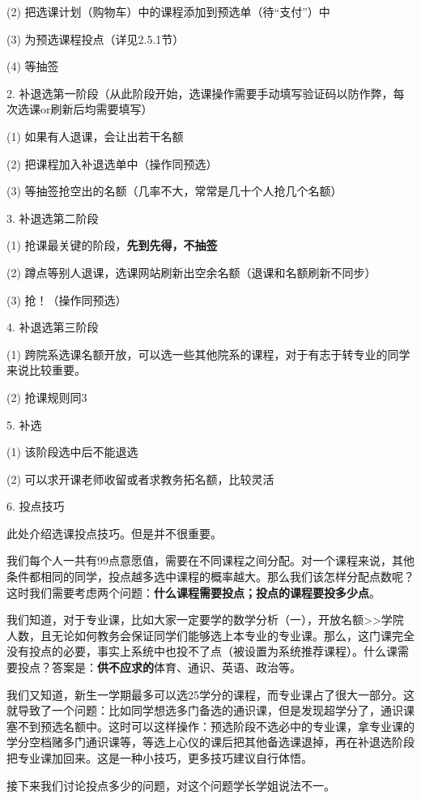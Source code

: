 \documentclass[11pt,oneside]{book}
\begin{document}
(2) 把选课计划（购物车）中的课程添加到预选单（待“支付”）中

(3) 为预选课程投点（详见2.5.1节）

(4) 等抽签

2. 补退选第一阶段（从此阶段开始，选课操作需要手动填写验证码以防作弊，每次选课or刷新后均需要填写）

(1) 如果有人退课，会让出若干名额

(2) 把课程加入补退选单中（操作同预选）

(3) 等抽签抢空出的名额（几率不大，常常是几十个人抢几个名额）

3. 补退选第二阶段

(1) 抢课最关键的阶段，\textbf{\textbf{先到先得，不抽签}}

(2) 蹲点等别人退课，选课网站刷新出空余名额（退课和名额刷新不同步）

(3) 抢！（操作同预选）

4. 补退选第三阶段

(1) 跨院系选课名额开放，可以选一些其他院系的课程，对于有志于转专业的同学来说比较重要。

(2) 抢课规则同3

5. 补选

(1) 该阶段选中后不能退选

(2) 可以求开课老师收留或者求教务拓名额，比较灵活

6. 投点技巧

此处介绍选课投点技巧。但是并不很重要。

我们每个人一共有99点意愿值，需要在不同课程之间分配。对一个课程来说，其他条件都相同的同学，投点越多选中课程的概率越大。那么我们该怎样分配点数呢？这时我们需要考虑两个问题：\textbf{\textbf{什么课程需要投点；投点的课程要投多少点}}。

我们知道，对于专业课，比如大家一定要学的数学分析（一），开放名额>>学院人数，且无论如何教务会保证同学们能够选上本专业的专业课。那么，这门课完全没有投点的必要，事实上系统中也投不了点（被设置为系统推荐课程）。什么课需要投点？答案是：\textbf{\textbf{供不应求的}}体育、通识、英语、政治等。

我们又知道，新生一学期最多可以选25学分的课程，而专业课占了很大一部分。这就导致了一个问题：比如同学想选多门备选的通识课，但是发现超学分了，通识课塞不到预选名额中。这时可以这样操作：预选阶段不选必中的专业课，拿专业课的学分空档赌多门通识课等，等选上心仪的课后把其他备选课退掉，再在补退选阶段把专业课加回来。这是一种小技巧，更多技巧建议自行体悟。

接下来我们讨论投点多少的问题，对这个问题学长学姐说法不一。
\end{document}
